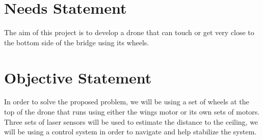 \documentclass{article}
\begin{document}
    \section{Needs Statement}
        The aim of this project is to develop a drone that can touch or get very close to the bottom side of the bridge using its wheels.

    \section{Objective Statement}
        In order to solve the proposed problem, we will be using a set of wheels at the top of the drone that runs using either the wings motor or its own sets of motors. Three sets of laser sensors will be used to estimate the distance to the ceiling, we will be using a control system in order to navigate and help stabilize the system.

    \newpage
\end{document}
